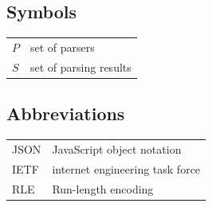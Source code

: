 \documentclass[english, 12pt, a4paper, sci, utf8, a-2b, online]{aaltothesis}
\begin{document}
\newpage
\thesistableofcontents


\subsection*{Symbols}

\begin{tabular}{ll}
	$P$		& set of parsers \\
	$S$		& set of parsing results
\end{tabular}

%

\subsection*{Abbreviations}

\begin{tabular}{ll}
	JSON	& JavaScript object notation \\
	IETF	& internet engineering task force \\
	RLE		& Run-length encoding
\end{tabular}
\end{document}
